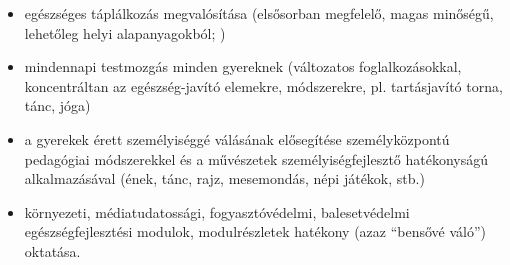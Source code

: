 \begin{itemize}

    \item
          egészséges táplálkozás megvalósítása (elsősorban megfelelő, magas minőségű, lehetőleg helyi alapanyagokból; )
    \item
          mindennapi testmozgás minden gyereknek (változatos foglalkozásokkal, koncentráltan az egészség-javító elemekre, módszerekre, pl. tartásjavító torna, tánc, jóga)
    \item
          a gyerekek érett személyiséggé válásának elősegítése személyközpontú pedagógiai módszerekkel és a művészetek személyiségfejlesztő hatékonyságú alkalmazásával (ének, tánc, rajz, mesemondás, népi játékok, stb.)
    \item
          környezeti, médiatudatossági, fogyasztóvédelmi, balesetvédelmi egészségfejlesztési modulok, modulrészletek hatékony (azaz ``bensővé váló'') oktatása.
\end{itemize}

